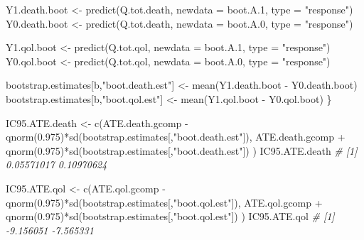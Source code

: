 \documentclass[
]{book}
\newenvironment{Shaded}{\begin{snugshade}}{\end{snugshade}}
\newcommand{\AttributeTok}[1]{\textcolor[rgb]{0.77,0.63,0.00}{#1}}
\newcommand{\CommentTok}[1]{\textcolor[rgb]{0.56,0.35,0.01}{\textit{#1}}}
\newcommand{\FloatTok}[1]{\textcolor[rgb]{0.00,0.00,0.81}{#1}}
\newcommand{\FunctionTok}[1]{\textcolor[rgb]{0.00,0.00,0.00}{#1}}
\newcommand{\NormalTok}[1]{#1}
\newcommand{\OtherTok}[1]{\textcolor[rgb]{0.56,0.35,0.01}{#1}}
\newcommand{\SpecialCharTok}[1]{\textcolor[rgb]{0.00,0.00,0.00}{#1}}
\newcommand{\StringTok}[1]{\textcolor[rgb]{0.31,0.60,0.02}{#1}}
\begin{document}
\begin{Shaded}
\begin{Highlighting}[]
\NormalTok{  Y1.death.boot }\OtherTok{\textless{}{-}} \FunctionTok{predict}\NormalTok{(Q.tot.death, }\AttributeTok{newdata =}\NormalTok{ boot.A}\FloatTok{.1}\NormalTok{, }\AttributeTok{type =} \StringTok{"response"}\NormalTok{)}
\NormalTok{  Y0.death.boot }\OtherTok{\textless{}{-}} \FunctionTok{predict}\NormalTok{(Q.tot.death, }\AttributeTok{newdata =}\NormalTok{ boot.A}\FloatTok{.0}\NormalTok{, }\AttributeTok{type =} \StringTok{"response"}\NormalTok{)}

\NormalTok{  Y1.qol.boot }\OtherTok{\textless{}{-}} \FunctionTok{predict}\NormalTok{(Q.tot.qol, }\AttributeTok{newdata =}\NormalTok{ boot.A}\FloatTok{.1}\NormalTok{, }\AttributeTok{type =} \StringTok{"response"}\NormalTok{)}
\NormalTok{  Y0.qol.boot }\OtherTok{\textless{}{-}} \FunctionTok{predict}\NormalTok{(Q.tot.qol, }\AttributeTok{newdata =}\NormalTok{ boot.A}\FloatTok{.0}\NormalTok{, }\AttributeTok{type =} \StringTok{"response"}\NormalTok{)}

\NormalTok{  bootstrap.estimates[b,}\StringTok{"boot.death.est"}\NormalTok{] }\OtherTok{\textless{}{-}} \FunctionTok{mean}\NormalTok{(Y1.death.boot }\SpecialCharTok{{-}}\NormalTok{ Y0.death.boot)}
\NormalTok{  bootstrap.estimates[b,}\StringTok{"boot.qol.est"}\NormalTok{] }\OtherTok{\textless{}{-}} \FunctionTok{mean}\NormalTok{(Y1.qol.boot }\SpecialCharTok{{-}}\NormalTok{ Y0.qol.boot)}
\NormalTok{\}}

\NormalTok{IC95.ATE.death }\OtherTok{\textless{}{-}} \FunctionTok{c}\NormalTok{(ATE.death.gcomp }\SpecialCharTok{{-}} 
                      \FunctionTok{qnorm}\NormalTok{(}\FloatTok{0.975}\NormalTok{)}\SpecialCharTok{*}\FunctionTok{sd}\NormalTok{(bootstrap.estimates[,}\StringTok{"boot.death.est"}\NormalTok{]),}
\NormalTok{                    ATE.death.gcomp }\SpecialCharTok{+} 
                      \FunctionTok{qnorm}\NormalTok{(}\FloatTok{0.975}\NormalTok{)}\SpecialCharTok{*}\FunctionTok{sd}\NormalTok{(bootstrap.estimates[,}\StringTok{"boot.death.est"}\NormalTok{]) )}
\NormalTok{IC95.ATE.death}
\CommentTok{\# [1] 0.05571017 0.10970624}

\NormalTok{IC95.ATE.qol }\OtherTok{\textless{}{-}} \FunctionTok{c}\NormalTok{(ATE.qol.gcomp }\SpecialCharTok{{-}} 
                    \FunctionTok{qnorm}\NormalTok{(}\FloatTok{0.975}\NormalTok{)}\SpecialCharTok{*}\FunctionTok{sd}\NormalTok{(bootstrap.estimates[,}\StringTok{"boot.qol.est"}\NormalTok{]),}
\NormalTok{                  ATE.qol.gcomp }\SpecialCharTok{+} 
                    \FunctionTok{qnorm}\NormalTok{(}\FloatTok{0.975}\NormalTok{)}\SpecialCharTok{*}\FunctionTok{sd}\NormalTok{(bootstrap.estimates[,}\StringTok{"boot.qol.est"}\NormalTok{]) )}
\NormalTok{IC95.ATE.qol}
\CommentTok{\# [1] {-}9.156051 {-}7.565331}
\end{Highlighting}
\end{Shaded}
\end{document}
